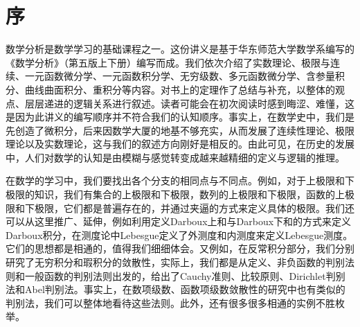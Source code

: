\chapter*{序}
数学分析是数学学习的基础课程之一。这份讲义是基于华东师范大学数学系编写的《数学分析》（第五版上下册）编写而成。我们依次介绍了实数理论、极限与连续、一元函数微分学、一元函数积分学、无穷级数、多元函数微分学、含参量积分、曲线曲面积分、重积分等内容。对书上的定理作了总结与补充，以整体的观点、层层递进的逻辑关系进行叙述。读者可能会在初次阅读时感到晦涩、难懂，这是因为此讲义的编写顺序并不符合我们的认知顺序。事实上，在数学史中，我们是先创造了微积分，后来因数学大厦的地基不够充实，从而发展了连续性理论、极限理论以及实数理论，这与我们的叙述方向刚好是相反的。由此可见，在历史的发展中，人们对数学的认知是由模糊与感觉转变成越来越精细的定义与逻辑的推理。

在数学的学习中，我们要找出各个分支的相同点与不同点。例如，对于上极限和下极限的知识，我们有集合的上极限和下极限，数列的上极限和下极限，函数的上极限和下极限，它们都是普遍存在的，并通过夹逼的方式来定义具体的极限。我们还可以从这里推广、延伸，例如利用定义Darboux上和与Darboux下和的方式来定义Darboux积分，在测度论中Lebesgue定义了外测度和内测度来定义Lebesgue测度。它们的思想都是相通的，值得我们细细体会。又例如，在反常积分部分，我们分别研究了无穷积分和瑕积分的敛散性，实际上，我们都是从定义、非负函数的判别法则和一般函数的判别法则出发的，给出了Cauchy准则、比较原则、Dirichlet判别法和Abel判别法。事实上，在数项级数、函数项级数敛散性的研究中也有类似的判别法，我们可以整体地看待这些法则。此外，还有很多很多相通的实例不胜枚举。